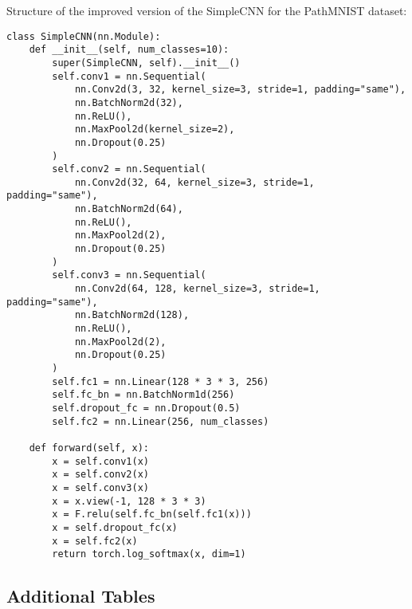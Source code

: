Structure of the improved version of the SimpleCNN for the PathMNIST dataset:\@

\begin{verbatim}
class SimpleCNN(nn.Module):
    def __init__(self, num_classes=10):
        super(SimpleCNN, self).__init__()
        self.conv1 = nn.Sequential(
            nn.Conv2d(3, 32, kernel_size=3, stride=1, padding="same"),
            nn.BatchNorm2d(32),
            nn.ReLU(),
            nn.MaxPool2d(kernel_size=2),
            nn.Dropout(0.25)
        )
        self.conv2 = nn.Sequential(
            nn.Conv2d(32, 64, kernel_size=3, stride=1, padding="same"),
            nn.BatchNorm2d(64),
            nn.ReLU(),
            nn.MaxPool2d(2),
            nn.Dropout(0.25)
        )
        self.conv3 = nn.Sequential(
            nn.Conv2d(64, 128, kernel_size=3, stride=1, padding="same"),
            nn.BatchNorm2d(128),
            nn.ReLU(),
            nn.MaxPool2d(2),
            nn.Dropout(0.25)
        )
        self.fc1 = nn.Linear(128 * 3 * 3, 256)
        self.fc_bn = nn.BatchNorm1d(256)
        self.dropout_fc = nn.Dropout(0.5)
        self.fc2 = nn.Linear(256, num_classes)

    def forward(self, x):
        x = self.conv1(x)
        x = self.conv2(x)
        x = self.conv3(x)
        x = x.view(-1, 128 * 3 * 3)
        x = F.relu(self.fc_bn(self.fc1(x)))
        x = self.dropout_fc(x)
        x = self.fc2(x)
        return torch.log_softmax(x, dim=1)
\end{verbatim}


\subsection{Additional Tables}\label{Appendixtables}


